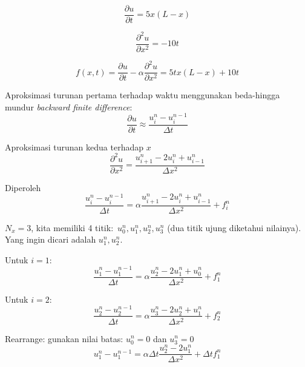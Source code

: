 \begin{equation*}
\frac{\partial u}{\partial t} = 5x(L-x)    
\end{equation*}

\begin{equation*}
\frac{\partial^{2}u}{\partial x^{2}} = -10t
\end{equation*}

\begin{equation*}
f(x,t) = \frac{\partial u}{\partial t} - \alpha\frac{\partial^{2}u}{\partial x^{2}}=5tx(L-x)+10t
\end{equation*}



Aproksimasi turunan pertama terhadap waktu menggunakan beda-hingga mundur
\textit{backward finite difference}:
\begin{equation*}
\frac{\partial u}{\partial t}\approx\frac{u_{i}^{n}-u_{i}^{n-1}}{\Delta t}
\end{equation*}

Aproksimasi turunan kedua terhadap $x$
\begin{equation*}
\frac{\partial^{2}u}{\partial x^{2}}=\frac{u_{i+1}^{n}-2u_{i}^{n}+u_{i-1}^{n}}{\Delta x^{2}}
\end{equation*}

Diperoleh
\begin{equation*}
\frac{u_{i}^{n}-u_{i}^{n-1}}{\Delta t}=\alpha\frac{u_{i+1}^{n}-2u_{i}^{n}+u_{i-1}^{n}}{\Delta x^{2}}+f_{i}^{n}
\end{equation*}

$N_{x}=3$, kita memiliki 4 titik:~$u_{0}^{n},u_{1}^{n},u_{2}^{n},u_{3}^{n}$
(dua titik ujung diketahui nilainya). Yang ingin dicari adalah $u_{1}^{n},u_{2}^{n}$.

Untuk $i=1$:
\begin{equation*}
\frac{u_{1}^{n}-u_{1}^{n-1}}{\Delta t}=\alpha\frac{u_{2}^{n}-2u_{1}^{n}+u_{0}^{n}}{\Delta x^{2}}+f_{1}^{n}
\end{equation*}

Untuk $i=2:$
\begin{equation*}
\frac{u_{2}^{n}-u_{2}^{n-1}}{\Delta t}=\alpha\frac{u_{3}^{n}-2u_{2}^{n}+u_{1}^{n}}{\Delta x^{2}}+f_{2}^{n}
\end{equation*}


Rearrange: gunakan nilai batas: $u_{0}^{n}=0$ dan $u_{3}^{n}=0$
\begin{equation*}
u_{1}^{n}-u_{1}^{n-1}=\alpha\Delta t\frac{u_{2}^{n}-2u_{1}^{n}}{\Delta x^{2}}+\Delta tf_{1}^{n}
\end{equation*}

